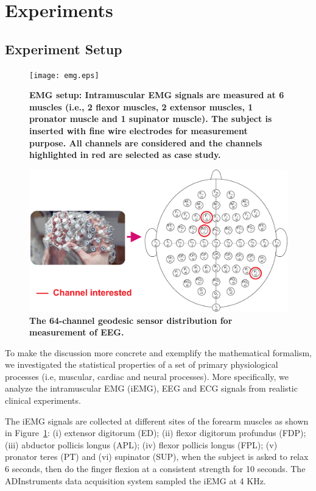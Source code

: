 \section{Experiments}
\label{Experiments}
\subsection{Experiment Setup}
\begin{figure}[htb]
\centering
\texttt{[image: emg.eps]}
\vskip -3mm
\caption{\textbf{EMG setup: Intramuscular EMG signals are measured at 6 muscles (i.e., 2 flexor muscles, 2 extensor muscles, 1 pronator muscle and 1 supinator muscle). The subject is inserted with fine wire electrodes for measurement purpose. All channels are considered and the channels highlighted in red are selected as case study.}}\label{fig:emg}
\vskip -6mm
\end{figure}
\begin{figure}[htb]
\centering
\includegraphics[width=0.9\columnwidth]{eeg.eps}
\vskip -3mm
\caption{\textbf{The 64-channel geodesic sensor distribution for measurement of EEG.}}\label{fig:eeg}
\vskip -5mm
\end{figure} 
 
To make the discussion more concrete and exemplify the mathematical formalism, we  investigated the statistical properties of a set of primary physiological processes (i.e, muscular, cardiac and neural processes). More specifically, we analyze the intramuscular EMG (iEMG), EEG and ECG signals from realistic clinical experiments. 
 
The iEMG signals are collected at different sites of the forearm muscles as shown in Figure~\ref{fig:emg}: (i) extensor digitorum (ED); (ii) flexor digitorum profundus (FDP); (iii) abductor pollicis longus (APL); (iv) flexor pollicis longus (FPL); (v) pronator teres (PT) and (vi) supinator (SUP), when the subject is asked to relax 6 seconds, then do the finger flexion at a consistent strength for 10 seconds. The ADInstruments data acquisition system sampled the iEMG at 4 KHz.

